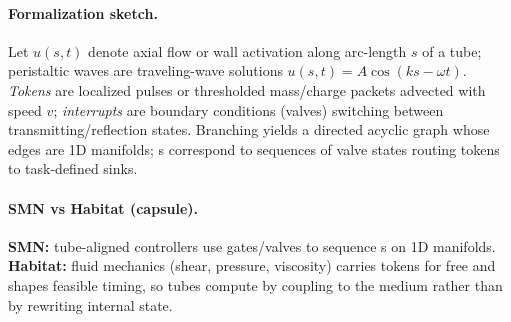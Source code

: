 \paragraph{Formalization sketch.}
Let $u(s,t)$ denote axial flow or wall activation along arc-length $s$ of a tube; peristaltic waves are traveling-wave solutions $u(s,t)=A\cos(ks-\omega t)$.
\emph{Tokens} are localized pulses or thresholded mass/charge packets advected with speed $v$; \emph{interrupts} are boundary conditions (valves) switching between transmitting/reflection states.
Branching yields a directed acyclic graph whose edges are 1D manifolds; \OAP{}s correspond to sequences of valve states routing tokens to task-defined sinks.

\paragraph{SMN vs Habitat (capsule).}
\textbf{SMN:} tube-aligned controllers use gates/valves to sequence \OAP{}s on 1D manifolds.
\textbf{Habitat:} fluid mechanics (shear, pressure, viscosity) carries tokens for free and shapes feasible timing, so tubes compute by coupling to the medium rather than by rewriting internal state.
